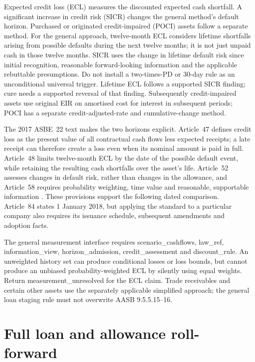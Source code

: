 Expected credit loss (ECL) measures the discounted expected cash shortfall. A significant increase in credit risk (SICR) changes the general method's default horizon. Purchased or originated credit-impaired (POCI) assets follow a separate method. For the general approach, twelve-month ECL considers lifetime shortfalls arising from possible defaults during the next twelve months; it is not just unpaid cash in those twelve months. SICR uses the change in lifetime default risk since initial recognition, reasonable forward-looking information and the applicable rebuttable presumptions. Do not install a two-times-PD or 30-day rule as an unconditional universal trigger. Lifetime ECL follows a supported SICR finding; cure needs a supported reversal of that finding. Subsequently credit-impaired assets use original EIR on amortised cost for interest in subsequent periods; POCI has a separate credit-adjusted-rate and cumulative-change method.

The 2017 ASBE~22 text makes the two horizons explicit. Article~47 defines
credit loss as the present value of all contractual cash flows less expected
receipts; a late receipt can therefore create a loss even when its nominal
amount is paid in full. Article~48 limits twelve-month ECL by the date of the
possible default event, while retaining the resulting cash shortfalls over the
asset's life. Article~52 assesses changes in default risk, rather than changes
in the allowance, and Article~58 requires probability weighting, time value
and reasonable, supportable information \citep[Articles 47--48, 52, 58]{mofasbe22}.
These provisions support the following dated comparison. Article~84 states
1 January 2018, but applying the standard to a particular company also requires
its issuance schedule, subsequent amendments and adoption facts.

The general measurement interface requires scenario\_cashflows, law\_ref, information\_view, horizon\_admission, credit\_assessment and discount\_rule. An unweighted history set can produce conditional losses or loss bounds, but cannot produce an unbiased probability-weighted ECL by silently using equal weights. Return measurement\_unresolved for the ECL claim. Trade receivables and certain other assets use the separately applicable simplified approach; the general loan staging rule must not overwrite AASB 9.5.5.15--16.

\hypertarget{full-loan-and-allowance-roll-forward}{%
\section{Full loan and allowance roll-forward}\label{method-bank-methods-full-loan-and-allowance-roll-forward}}

